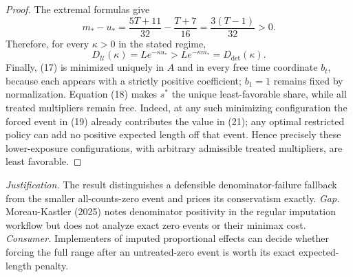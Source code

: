 \documentclass{article}
\begin{document}
\begin{proof}
The extremal formulas give
\[
 m_*-u_*=\frac{5T+11}{32}-\frac{T+7}{16}
 =\frac{3(T-1)}{32}>0.
\]
Therefore, for every \(\kappa>0\) in the stated regime,
\[
 D_{\mathcal U}(\kappa)=Le^{-\kappa u_*}
 >Le^{-\kappa m_*}=D_{\mathrm{det}}(\kappa).
\]
Finally, (17) is minimized uniquely in \(A\) and in every free time coordinate \(b_t\), because each appears with a strictly positive coefficient; \(b_1=1\) remains fixed by normalization.  Equation (18) makes \(s^*\) the unique least-favorable share, while all treated multipliers remain free.  Indeed, at any such minimizing configuration the forced event in (19) already contributes the value in (21); any optimal restricted policy can add no positive expected length off that event.  Hence precisely these lower-exposure configurations, with arbitrary admissible treated multipliers, are least favorable.
\end{proof}
\par\smallskip\noindent \textit{Justification.} The result distinguishes a defensible denominator-failure fallback from the smaller all-counts-zero event and prices its conservatism exactly. \textit{Gap.} Moreau-Kastler (2025) notes denominator positivity in the regular imputation workflow but does not analyze exact zero events or their minimax cost. \textit{Consumer.} Implementers of imputed proportional effects can decide whether forcing the full range after an untreated-zero event is worth its exact expected-length penalty.
\end{document}
